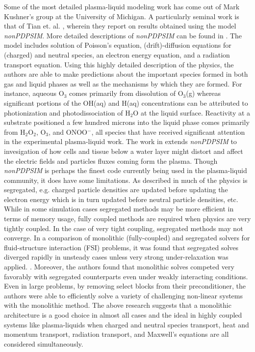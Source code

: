 Some of the most detailed plasma-liquid modeling work has come out of Mark Kushner's group at the University of Michigan. A particularly seminal work is that of Tian et. al. \cite{Tian2014}, wherein they report on results obtained using the model \textit{nonPDPSIM}. More detailed descriptions of \textit{nonPDPSIM} can be found in \cite{lay2002breakdown,xiong2010surface}. The model includes solution of Poisson's equation, (drift)-diffusion equations for (charged) and neutral species, an electron energy equation, and a radiation transport equation. Using this highly detailed description of the physics, the authors are able to make predictions about the important species formed in both gas and liquid phases as well as the mechanisms by which they are formed. For instance, aqueous O$_3$ comes primarily from dissolution of O$_3$(g) whereas significant portions of the OH(aq) and H(aq) concentrations can be attributed to photionization and photodissociation of H$_2$O at the liquid surface. Reactivity at a substrate positioned a few hundred microns into the liquid phase comes primarily from H$_2$O$_2$, O$_3$, and ONOO$^-$, all species that have received significant attention in the experimental plasma-liquid work. The work in \cite{Babaeva2014b} extends \textit{nonPDPSIM} to invesigation of how cells and tissue below a water layer might distort and affect the electric fields and particles fluxes coming form the plasma. Though \textit{nonPDPSIM} is perhaps the finest code currently being used in the plasma-liquid community, it does have some limitations. As described in \cite{xiong2010surface} much of the physics is segregated, e.g. charged particle densities are updated before updating the electron energy which is in turn updated before neutral particle densities, etc. While in some simulation cases segregated methods may be more efficient in terms of memory usage, fully coupled methods are required when physics are very tightly coupled. In the case of very tight coupling, segregated methods may not converge. In a comparison of monolithic (fully-coupled) and segregated solvers for fluid-structure interaction (FSI) problems, it was found that segregated solves diverged rapidly in unsteady cases unless very strong under-relaxation was applied. \cite{heil2008solvers}. Moreover, the authors found that monolithic solves competed very favorably with segregated counterparts even under weakly interacting conditions. Even in large problems, by removing select blocks from their preconditioner, the authors were able to efficiently solve a variety of challenging non-linear systems with the monolithic method. The above research suggests that a monolithic architecture is a good choice in almost all cases and the ideal in highly coupled systems like plasma-liquids when charged and neutral species transport, heat and momentum transport, radiation transport, and Maxwell's equations are all considered simultaneously.

